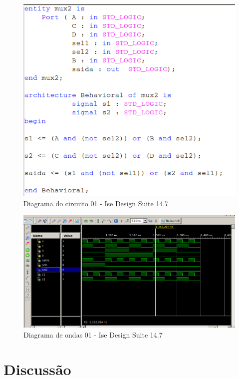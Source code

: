 \documentclass[12pts]{article}
\begin{document}
\begin{figure}[!htb]
  \centering
  \includegraphics[scale=0.4]{img/vhdlmux4}
  \caption{Diagrama do circuito 01 - Ise Design Suite 14.7}
  \label{figRotulo}
\end{figure}

\begin{figure}[!htb]
  \centering
  \includegraphics[scale=0.4]{img/mux4}
  \caption{Diagrama de ondas 01 - Ise Design Suite 14.7}
  \label{figRotulo}
\end{figure}




\newpage

\section{Discussão}

\end{document}
